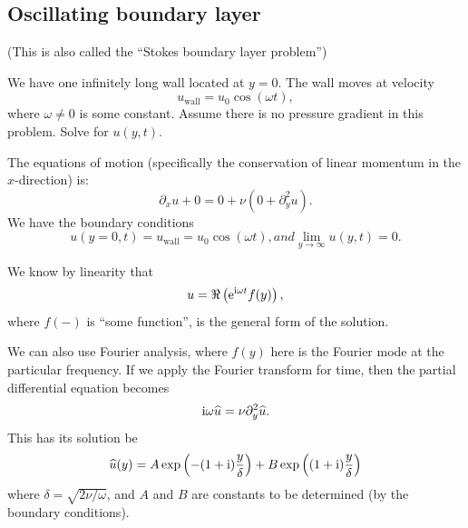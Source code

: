 \subsection{Oscillating boundary layer}

(This is also called the ``Stokes boundary layer problem'')

\begin{problem}
We have one infinitely long wall located at $y=0$. The wall moves at
velocity
\begin{equation}
u_{\text{wall}}=u_{0}\cos(\omega t),
\end{equation}
where $\omega\neq0$ is some constant. Assume there is no pressure
gradient in this problem. Solve for $u(y,t)$.
\end{problem}

\begin{node}
The equations of motion (specifically the conservation of linear
momentum in the $x$-direction) is:
\begin{equation}
\partial_{x}u + 0 = 0 + \nu(0 + \partial_{y}^{2}u).
\end{equation}
We have the boundary conditions
\begin{subequations}
\begin{equation}
u(y=0,t)=u_{\text{wall}}=u_{0}\cos(\omega t),
\end{equation}
and
\begin{equation}
\lim_{y\to\infty}u(y,t)=0.
\end{equation}
\end{subequations}
\end{node}

\begin{node}
We know by linearity that
\begin{equation}
u = \Re\left(\mathrm{e}^{\mathrm{i} \omega t}f(y)\right),
\end{equation}
where $f(-)$ is ``some function'', is the general form of the solution.
\end{node}

\begin{node}
We can also use Fourier analysis, where $f(y)$ here is the Fourier
mode at the particular frequency. If we apply the Fourier transform
for time, then the partial differential equation becomes
\begin{equation}
\mathrm{i}\omega\widehat{u}=\nu\partial_{y}^{2}\widehat{u}.
\end{equation}
This has its solution be
\begin{equation}
\widehat{u}(y)=A\exp\left(-(1+\mathrm{i})\frac{y}{\delta}\right)+B\exp\left((1+\mathrm{i})\frac{y}{\delta}\right)
\end{equation}
where $\delta=\sqrt{2\nu/\omega}$, and $A$ and $B$ are constants to be
determined (by the boundary conditions).
\end{node}


